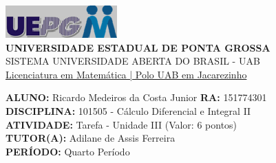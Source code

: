 \documentclass[a4paper, 12pt]{article}
\begin{document}
\begin{flushleft}\includegraphics{logo}\\
\textbf{UNIVERSIDADE ESTADUAL DE PONTA GROSSA} \\
SISTEMA UNIVERSIDADE ABERTA DO BRASIL - UAB \\
\underline{Licenciatura em Matemática | Polo UAB em Jacarezinho}\end{flushleft} 
\textbf{ALUNO:} Ricardo Medeiros da Costa Junior   \textbf{RA:} 151774301 \\
\textbf{DISCIPLINA:} 101505 - Cálculo Diferencial e Integral II \\
\textbf{ATIVIDADE:} Tarefa - Unidade III (Valor: 6 pontos) \\
\textbf{TUTOR(A):} Adilane de Assis Ferreira \\
\textbf{PERÍODO:} Quarto Período \\
\end{document}
